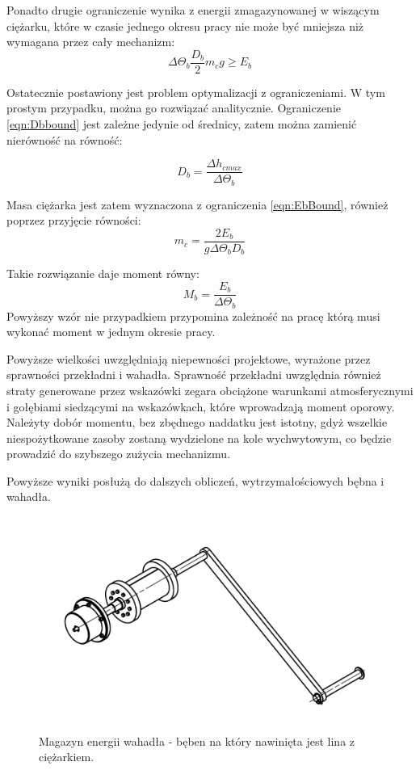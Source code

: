 Ponadto drugie ograniczenie wynika z energii zmagazynowanej w wiszącym ciężarku, które w czasie jednego okresu pracy nie może być mniejsza niż wymagana przez cały mechanizm:
\begin{equation}
\label{eqn:EbBound}
\Delta \Theta_b \frac{D_b}{2} m_c g \geq E_b
\end{equation}

Ostatecznie postawiony jest problem optymalizacji z ograniczeniami. W tym prostym przypadku, można go rozwiązać analitycznie. Ograniczenie \ref{eqn:Dbbound} jest zależne jedynie od średnicy, zatem można zamienić nierówność na równość:

\begin{equation}
D_b = \frac{\Delta h_{cmax}}{\Delta \Theta_b}
\end{equation}

Masa ciężarka jest zatem wyznaczona z ograniczenia \ref{eqn:EbBound}, również poprzez przyjęcie równości:
\begin{equation}
m_c = \frac{2E_b}{g\Delta \Theta_b D_b}
\end{equation}

Takie rozwiązanie daje moment równy:
\begin{equation}
M_b = \frac{E_b}{\Delta \Theta_b}
\end{equation}
Powyższy wzór nie przypadkiem przypomina zależność na pracę którą musi wykonać moment w jednym okresie pracy.

Powyższe wielkości uwzględniają niepewności projektowe, wyrażone przez sprawności przekładni i wahadła. Sprawność przekładni uwzględnia również straty generowane przez wskazówki zegara obciążone warunkami atmosferycznymi i gołębiami siedzącymi na wskazówkach, które wprowadzają moment oporowy. Należyty dobór momentu, bez zbędnego naddatku jest istotny, gdyż wszelkie niespożytkowane zasoby zostaną wydzielone na kole wychwytowym, co będzie prowadzić do szybszego zużycia mechanizmu.

Powyższe wyniki posłużą do dalszych obliczeń, wytrzymałościowych bębna i wahadła.
\begin{figure}
	\centering
	\includegraphics[width=0.9\linewidth]{Projekt/beben}
	\caption{Magazyn energii wahadła - bęben na który nawinięta jest lina z ciężarkiem.}
	\label{fig:beben}
\end{figure}
